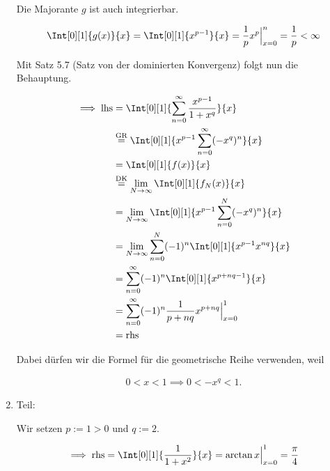 \begin{solution}
\begin{enumerate}[label = \arabic*.]
    Die Majorante $g$ ist auch integrierbar.

    \begin{align*}
        \Int[0][1]{g(x)}{x}
        =
        \Int[0][1]{x^{p-1}}{x}
        =
        \frac{1}{p}
        x^p \Big |_{x=0}^n
        =
        \frac{1}{p}
        <
        \infty
    \end{align*}

    Mit Satz 5.7 (Satz von der dominierten Konvergenz) folgt nun die Behauptung.

    \begin{align*}
        \implies
        \mathrm{lhs}
        & =
        \Int[0][1]
        {
            \sum_{n=0}^\infty
            \frac{x^{p-1}}{1 + x^q}
        }{x} \\
        & \stackrel
        {
            \mathrm{GR}
        }{=}
        \Int[0][1]
        {
            x^{p-1}
            \sum_{n=0}^\infty
            (-x^q)^n
        }{x} \\
        & =
        \Int[0][1]
        {
            f(x)
        }{x} \\
        & \stackrel
        {
            \mathrm{DK}
        }{=}
        \lim_{N \to \infty}
        \Int[0][1]
        {
            f_N(x)
        }{x} \\
        & =
        \lim_{N \to \infty}
        \Int[0][1]
        {
            x^{p-1}
            \sum_{n=0}^N
            (-x^q)^n
        }{x} \\
        & =
        \lim_{N \to \infty}
        \sum_{n=0}^N
        (-1)^n
        \Int[0][1]
        {
            x^{p-1}
            x^{n q}
        }{x} \\
        & =
        \sum_{n=0}^\infty
        (-1)^n
        \Int[0][1]
        {
            x^{p + n q - 1}
        }{x} \\
        & =
        \sum_{n=0}^\infty
        (-1)^n
        \frac{1}{p + n q}
        x^{p + n q} \Big |_{x=0}^1 \\
        & =
        \mathrm{rhs}
    \end{align*}

    Dabei dürfen wir die Formel für die geometrische Reihe verwenden, weil

    \begin{align*}
        0 < x < 1
        \implies
        0 < -x^q < 1.
    \end{align*}

    \item Teil:
    
    Wir setzen $p := 1 > 0$ und $q := 2$.

    \begin{align*}
        \implies
        \mathrm{rhs}
        =
        \Int[0][1]
        {
            \frac{1}{1 + x^2}
        }{x}
        =
        \arctan x \Big |_{x=0}^1
        =
        \frac{\pi}{4}
    \end{align*}

\end{enumerate}

\end{solution}

